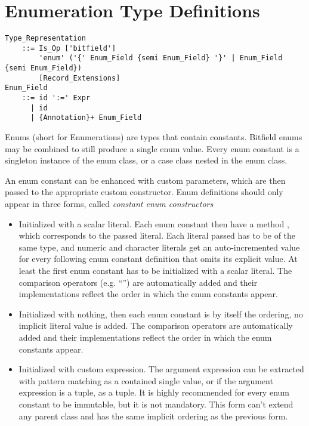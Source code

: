 \section{Enumeration Type Definitions}
\label{sec:enums}

\grammar\begin{lstlisting}
Type_Representation
    ::= Is_Op ['bitfield'] 
        'enum' ('{' Enum_Field {semi Enum_Field} '}' | Enum_Field {semi Enum_Field})
        [Record_Extensions]
Enum_Field 
    ::= id ':=' Expr
      | id
      | {Annotation}+ Enum_Field
\end{lstlisting}

Enums (short for Enumerations) are types that contain constants. Bitfield enums may be combined to still produce a single enum value. Every enum constant is a singleton instance of the enum class, or a case class nested in the enum class. 

An enum constant can be enhanced with custom parameters, which are then passed to the appropriate custom constructor. Enum definitions should only appear in three forms, called {\em constant enum constructors}
\begin{itemize}
  \item Initialized with a scalar literal. Each enum constant then have a method , which corresponds to the passed literal. Each literal passed has to be of the same type, and numeric and character literals get an auto-incremented value for every following enum constant definition that omits its explicit value. At least the first enum constant has to be initialized with a scalar literal. The comparison operators (e.g. ``\code{<}'') are automatically added and their implementations reflect the order in which the enum constants appear.
  \item Initialized with nothing, then each enum constant is by itself the ordering, no implicit literal value is added. The comparison operators are automatically added and their implementations reflect the order in which the enum constants appear. 
  \item Initialized with custom expression. The argument expression can be extracted with pattern matching as a contained single value, or if the argument expression is a tuple, as a tuple. It is highly recommended for every enum constant to be immutable, but it is not mandatory. This form can't extend any parent class and has the same implicit ordering as the previous form. 
\end{itemize}





